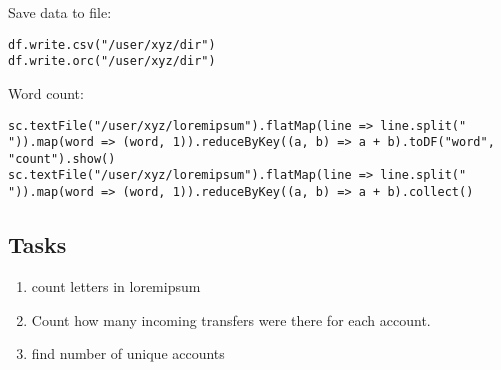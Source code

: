 \documentclass{article}
\begin{document}
Save data to file:
\begin{lstlisting}[]
df.write.csv("/user/xyz/dir")
df.write.orc("/user/xyz/dir")
\end{lstlisting}

Word count:
\begin{lstlisting}[]
sc.textFile("/user/xyz/loremipsum").flatMap(line => line.split(" ")).map(word => (word, 1)).reduceByKey((a, b) => a + b).toDF("word", "count").show()
sc.textFile("/user/xyz/loremipsum").flatMap(line => line.split(" ")).map(word => (word, 1)).reduceByKey((a, b) => a + b).collect()
\end{lstlisting}


\subsection*{Tasks}

\begin{enumerate}
\item count letters in loremipsum
\item Count how many incoming transfers were there for each account.
\item find number of unique accounts
\end{enumerate}
\end{document}
